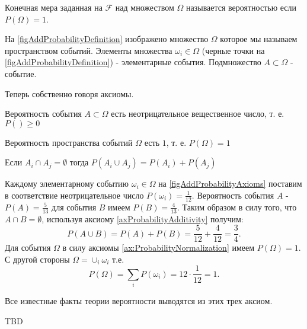 \begin{definition}[Вероятность $P$]
  \label{def:probability}
  Конечная мера заданная на $\mathcal{F}$ над множеством $\Omega$
  называется вероятностью если $P\left(\Omega\right) = 1$.
\end{definition}

\begin{example}

На \autoref{figAddProbabilityDefinition} изображено множество
$\Omega$ которое мы называем пространством событий. Элементы
множества $\omega_i \in \Omega$ (черные точки на
\autoref{figAddProbabilityDefinition}) - элементарные
события. Подмножество $A \subset \Omega$ - событие.
\end{example}

Теперь собственно говоря аксиомы.

\begin{axiom}[Не-отрицательность]
  \label{axProbabilityKolmogorovNonNegativity}
  Вероятность события $A \subset \Omega$ есть неотрицательное
  вещественное число, т. е. $P\left(\right) \ge 0$
\end{axiom}

\begin{axiom}[Нормировка]
  \label{ax:ProbabilityNormalization}
  Вероятность пространства событий $\Omega$ есть $1$, т. е.
  $P\left(\Omega\right) = 1$
\end{axiom}

\begin{axiom}[Аддитивность]
\label{axProbabilityAdditivity}
Если $A_i \cap A_j = \emptyset$ тогда 
$P\left(A_i \cup A_j\right) = P\left(A_i\right) + P\left(A_j\right)$
\end{axiom}

\begin{example}

Каждому элементарному событию $\omega_i \in \Omega$
на \autoref{figAddProbabilityAxioms} поставим в соответствие
неотрицательное число 
$P\left(\omega_i\right) = \frac{1}{12}$. Вероятность события $A$ - 
$P\left(A\right) = \frac{5}{13}$ для события $B$ имеем
$P\left(B\right) = \frac{4}{13}$. Таким образом в силу того, что 
$A \cap B = \emptyset$, используя аксиому
\ref{axProbabilityAdditivity} получим:
\[
P\left(A\cup B\right) = 
P\left(A\right) + P\left(B\right) = 
\frac{5}{12} + \frac{4}{12} = \frac{3}{4}.
\]
Для события $\Omega$ в силу аксиомы \ref{ax:ProbabilityNormalization}
имеем $P\left(\Omega\right) = 1$. С другой стороны 
$\Omega = \cup_i \omega_i$ т.е. 
\[
P\left(\Omega\right) = \sum_i P\left(\omega_i\right) =
12\cdot\frac{1}{12} = 1.
\]
\end{example}


Все известные факты теории вероятности выводятся из этих трех аксиом.  



TBD
